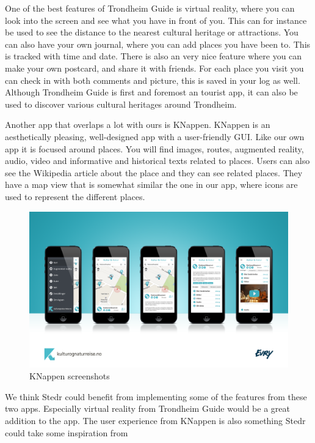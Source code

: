 One of the best features of Trondheim Guide is virtual reality, where you can look into the screen and see what you have in front of you. This can for instance be used to see the distance to the nearest cultural heritage or attractions. You can also have your own journal, where you can add places you have been to. This is tracked with time and date. There is also an very nice feature where you can make your own postcard, and share it with friends. For each place you visit you can check in with both comments and picture, this is saved in your log as well. Although Trondheim Guide is first and foremost an tourist app, it can also be used to discover various cultural heritages around Trondheim.

Another app that overlaps a lot with ours is KNappen. KNappen is an aesthetically pleasing, well-designed app with a user-friendly GUI. Like our own app it is focused around places. You will find images, routes, augmented reality, audio, video and informative and historical texts related to places. Users can also see the Wikipedia article about the place and they can see related places. They have a map view that is somewhat similar the one in our app, where icons are used to represent the different places.


\begin{figure}[h!]
\begin{center}
\includegraphics[width=1\textwidth]{res/image02.png}
\caption{KNappen screenshots}
\end{center}
\end{figure}


We think Stedr could benefit from implementing some of the features from these two apps. Especially virtual reality from Trondheim Guide would be a great addition to the app. The user experience from KNappen is also something Stedr could take some inspiration from
